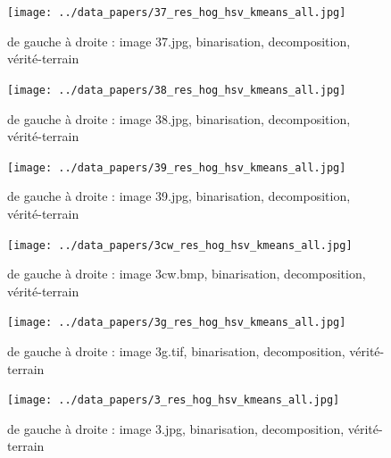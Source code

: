 \documentclass{book}
\begin{document}
\begin{figure}[H]
\begin{center}
\texttt{[image: ../data\_papers/37\_res\_hog\_hsv\_kmeans\_all.jpg]}
\end{center}
\caption{de gauche à droite : image 37.jpg, binarisation, decomposition, vérité-terrain}
\label{37}
\end{figure}
\clearpage


\begin{figure}[H]
\begin{center}
\texttt{[image: ../data\_papers/38\_res\_hog\_hsv\_kmeans\_all.jpg]}
\end{center}
\caption{de gauche à droite : image 38.jpg, binarisation, decomposition, vérité-terrain}
\label{38}
\end{figure}
\clearpage


\begin{figure}[H]
\begin{center}
\texttt{[image: ../data\_papers/39\_res\_hog\_hsv\_kmeans\_all.jpg]}
\end{center}
\caption{de gauche à droite : image 39.jpg, binarisation, decomposition, vérité-terrain}
\label{39}
\end{figure}
\clearpage


\begin{figure}[H]
\begin{center}
\texttt{[image: ../data\_papers/3cw\_res\_hog\_hsv\_kmeans\_all.jpg]}
\end{center}
\caption{de gauche à droite : image 3cw.bmp, binarisation, decomposition, vérité-terrain}
\label{3cw}
\end{figure}
\clearpage


\begin{figure}[H]
\begin{center}
\texttt{[image: ../data\_papers/3g\_res\_hog\_hsv\_kmeans\_all.jpg]}
\end{center}
\caption{de gauche à droite : image 3g.tif, binarisation, decomposition, vérité-terrain}
\label{3g}
\end{figure}
\clearpage


\begin{figure}[H]
\begin{center}
\texttt{[image: ../data\_papers/3\_res\_hog\_hsv\_kmeans\_all.jpg]}
\end{center}
\caption{de gauche à droite : image 3.jpg, binarisation, decomposition, vérité-terrain}
\label{3}
\end{figure}
\clearpage
\end{document}
